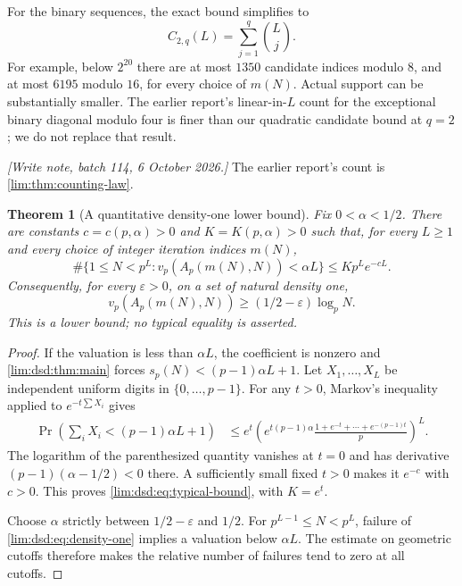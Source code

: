 \documentclass[11pt]{article}
\newtheorem{theorem}{Theorem}[section]
\theoremstyle{definition}
\theoremstyle{remark}
\begin{document}
For the binary sequences, the exact bound simplifies to
\begin{equation}
 C_{2,q}(L)=\sum_{j=1}^q\binom Lj.
 \label{lim:dsd:eq:binary-count}
\end{equation}
For example, below $2^{20}$ there are at most $1350$ candidate
indices modulo $8$, and at most $6195$ modulo $16$, for every
choice of $m(N)$. Actual support can be substantially smaller.
The earlier report's linear-in-$L$ count for the exceptional
binary diagonal modulo four is finer than our quadratic candidate
bound at $q=2$; we do not replace that result.

\emph{[Write note, batch 114, 6 October 2026.]} The earlier report's count is
\cref{lim:thm:counting-law}.

\begin{theorem}[A quantitative density-one lower bound]
\label{lim:dsd:thm:typical}
Fix $0<\alpha<1/2$. There are constants $c=c(p,\alpha)>0$ and
$K=K(p,\alpha)>0$ such that, for every $L\ge1$ and every choice
of integer iteration indices $m(N)$,
\begin{equation}
 \#\{1\le N<p^L:v_p(A_p(m(N),N))<\alpha L\}
 \le Kp^L e^{-cL}.
 \label{lim:dsd:eq:typical-bound}
\end{equation}
Consequently, for every $\varepsilon>0$, on a set of natural density
one,
\begin{equation}
 v_p(A_p(m(N),N))\ge(1/2-\varepsilon)\log_p N.
 \label{lim:dsd:eq:density-one}
\end{equation}
This is a lower bound; no typical equality is asserted.
\end{theorem}
\begin{proof}
If the valuation is less than $\alpha L$, the coefficient is
nonzero and \cref{lim:dsd:thm:main} forces
$s_p(N)<(p-1)\alpha L+1$. Let $X_1,\ldots,X_L$ be independent
uniform digits in $\{0,\ldots,p-1\}$. For any $t>0$, Markov's
inequality applied to $e^{-t\sum X_i}$ gives
\begin{align*}
 \Pr\!\left(\sum_iX_i<(p-1)\alpha L+1\right)
 &\le e^t\left(
 e^{t(p-1)\alpha}\frac{1+e^{-t}+\cdots+e^{-(p-1)t}}p
 \right)^L.
\end{align*}
The logarithm of the parenthesized quantity vanishes at $t=0$
and has derivative $(p-1)(\alpha-1/2)<0$ there. A sufficiently
small fixed $t>0$ makes it $e^{-c}$ with $c>0$. This proves
\eqref{lim:dsd:eq:typical-bound}, with $K=e^t$.

Choose $\alpha$ strictly between $1/2-\varepsilon$ and $1/2$.
For $p^{L-1}\le N<p^L$, failure of
\eqref{lim:dsd:eq:density-one} implies a valuation below $\alpha L$.
The estimate on geometric cutoffs therefore makes the relative
number of failures tend to zero at all cutoffs.
\end{proof}
\end{document}
